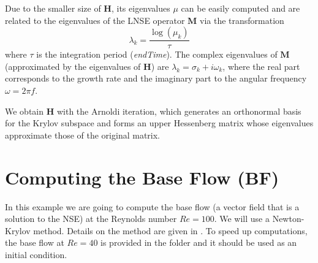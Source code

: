 \documentclass{article}
\begin{document}
Due to the smaller size of $\mathbf{H}$, its eigenvalues $\mu$ can be easily computed and are related to the eigenvalues of the LNSE operator $\mathbf{M}$ via the transformation
\begin{equation*}
    \lambda_k=\dfrac{\log(\mu_k)}{\tau}
\end{equation*}
where $\tau$ is the integration period (\textit{endTime}).
The complex eigenvalues of $\mathbf{M}$ (approximated by the eigenvalues of $\mathbf{H}$) are $\lambda_k = \sigma_k + i\omega_k$, where the real part corresponds to the growth rate and the imaginary part to the angular frequency $\omega=2\pi f$.

We obtain $\mathbf{H}$ with the Arnoldi iteration, which generates an orthonormal basis for the Krylov subspace and forms an upper Hessenberg matrix whose eigenvalues approximate those of the original matrix.


\newpage
\section{Computing the Base Flow (BF)}

In this example we are going to compute the base flow (a vector field that is a solution to the NSE) at the Reynolds number $Re=100$. We will use a Newton-Krylov method. Details on the method are given in \cite{frantz2023krylov}. 
To speed up computations, the base flow at $Re=40$ is provided in the folder and it should be used as an initial condition.
\end{document}
